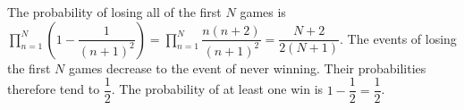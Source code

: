 The probability of losing all of the first $N$ games is $\prod_{n=1}^{N}\left(1-\dfrac{1}{(n+1)^2}\right)=\prod_{n=1}^{N}\dfrac{n(n+2)}{(n+1)^2}=\dfrac{N+2}{2(N+1)}$. The events of losing the first $N$ games decrease to the event of never winning. Their probabilities therefore tend to $\dfrac{1}{2}$. The probability of at least one win is $1-\dfrac{1}{2}=\boxed{\dfrac{1}{2}}$.
